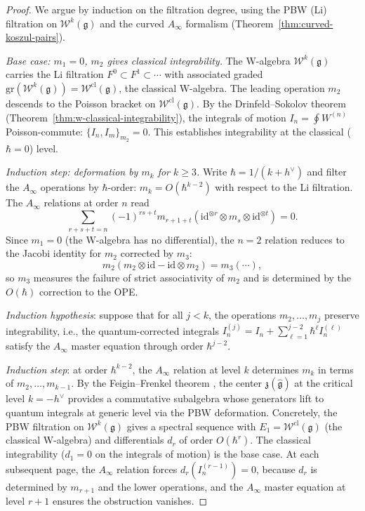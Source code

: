 \begin{proof}
We argue by induction on the filtration degree, using the PBW (Li) filtration on $\mathcal{W}^k(\mathfrak{g})$ and the curved $A_\infty$ formalism (Theorem~\ref{thm:curved-koszul-pairs}).

\emph{Base case: $m_1 = 0$, $m_2$ gives classical integrability.}
The W-algebra $\mathcal{W}^k(\mathfrak{g})$ carries the Li filtration $F^0 \subset F^1 \subset \cdots$ with associated graded $\mathrm{gr}(\mathcal{W}^k(\mathfrak{g})) = \mathcal{W}^{\mathrm{cl}}(\mathfrak{g})$, the classical W-algebra.  The leading operation $m_2$ descends to the Poisson bracket on $\mathcal{W}^{\mathrm{cl}}(\mathfrak{g})$.  By the Drinfeld--Sokolov theorem (Theorem~\ref{thm:w-classical-integrability}), the integrals of motion $I_n = \oint W^{(n)}$ Poisson-commute: $\{I_n, I_m\}_{m_2} = 0$.  This establishes integrability at the classical ($\hbar = 0$) level.

\emph{Induction step: deformation by $m_k$ for $k \geq 3$.}
Write $\hbar = 1/(k + h^\vee)$ and filter the $A_\infty$ operations by $\hbar$-order: $m_k = O(\hbar^{k-2})$ with respect to the Li filtration.  The $A_\infty$ relations at order $n$ read
\[
\sum_{r+s+t=n} (-1)^{rs+t} m_{r+1+t}(\mathrm{id}^{\otimes r} \otimes m_s \otimes \mathrm{id}^{\otimes t}) = 0.
\]
Since $m_1 = 0$ (the W-algebra has no differential), the $n = 2$ relation reduces to the Jacobi identity for $m_2$ corrected by $m_3$:
\[
m_2(m_2 \otimes \mathrm{id} - \mathrm{id} \otimes m_2) = m_3(\cdots),
\]
so $m_3$ measures the failure of strict associativity of $m_2$ and is determined by the $O(\hbar)$ correction to the OPE.

\emph{Induction hypothesis}: suppose that for all $j < k$, the operations $m_2, \ldots, m_j$ preserve integrability, i.e., the quantum-corrected integrals $I_n^{(j)} = I_n + \sum_{\ell=1}^{j-2} \hbar^\ell I_n^{(\ell)}$ satisfy the $A_\infty$ master equation through order $\hbar^{j-2}$.

\emph{Induction step}: at order $\hbar^{k-2}$, the $A_\infty$ relation at level $k$ determines $m_k$ in terms of $m_2, \ldots, m_{k-1}$.  By the Feigin--Frenkel theorem \cite{Feigin-Frenkel}, the center $\mathfrak{z}(\widehat{\mathfrak{g}})$ at the critical level $k = -h^\vee$ provides a commutative subalgebra whose generators lift to quantum integrals at generic level via the PBW deformation.  Concretely, the PBW filtration on $\mathcal{W}^k(\mathfrak{g})$ gives a spectral sequence with $E_1 = \mathcal{W}^{\mathrm{cl}}(\mathfrak{g})$ (the classical W-algebra) and differentials $d_r$ of order $O(\hbar^r)$.  The classical integrability ($d_1 = 0$ on the integrals of motion) is the base case.  At each subsequent page, the $A_\infty$ relation forces $d_r(I_n^{(r-1)}) = 0$, because $d_r$ is determined by $m_{r+1}$ and the lower operations, and the $A_\infty$ master equation at level $r+1$ ensures the obstruction vanishes.


\end{proof}
